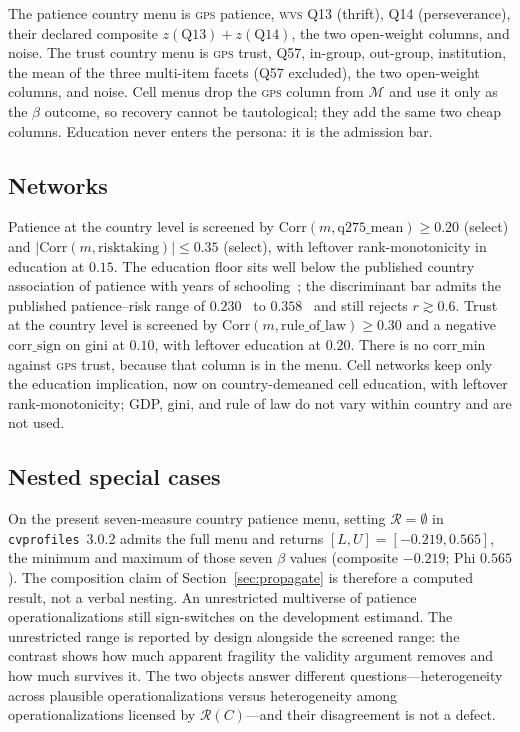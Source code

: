 \documentclass[10pt,letterpaper]{article}
\newcommand{\GPS}{\textsc{gps}}
\newcommand{\WVS}{\textsc{wvs}}
\newcommand{\cvp}{\texttt{cvprofiles}}
\newcommand{\M}{\ensuremath{\mathcal{M}}}
\newcommand{\Rset}{\mathcal{R}}
\begin{document}
The patience country menu is \GPS{} patience, \WVS{} Q13 (thrift), Q14 (perseverance), their declared composite $z(\mathrm{Q13})+z(\mathrm{Q14})$, the two open-weight columns, and noise.
The trust country menu is \GPS{} trust, Q57, in-group, out-group, institution, the mean of the three multi-item facets (Q57 excluded), the two open-weight columns, and noise.
Cell menus drop the \GPS{} column from $\M$ and use it only as the $\beta$ outcome, so recovery cannot be tautological; they add the same two cheap columns.
Education never enters the persona: it is the admission bar.

\subsection{Networks}
\label{sec:app-network}

Patience at the country level is screened by $\mathrm{Corr}(m,\mathrm{q275\_mean})\ge 0.20$ (select) and $|\mathrm{Corr}(m,\mathrm{risktaking})|\le 0.35$ (select), with leftover rank-monotonicity in education at $0.15$.
The education floor sits well below the published country association of patience with years of schooling~\cite{falk2018}; the discriminant bar admits the published patience--risk range of $0.230$~\cite{falk2018} to $0.358$~\cite{hanushek2022} and still rejects $r\gtrsim 0.6$.
Trust at the country level is screened by $\mathrm{Corr}(m,\mathrm{rule\_of\_law})\ge 0.30$ and a negative $\mathrm{corr\_sign}$ on gini at $0.10$, with leftover education at $0.20$.
There is no $\mathrm{corr\_min}$ against \GPS{} trust, because that column is in the menu.
Cell networks keep only the education implication, now on country-demeaned cell education, with leftover rank-monotonicity; GDP, gini, and rule of law do not vary within country and are not used.

\subsection{Nested special cases}
\label{sec:app-special}

On the present seven-measure country patience menu, setting $\Rset=\emptyset$ in \cvp{}~3.0.2 admits the full menu and returns $[L,U]=[-0.219,0.565]$, the minimum and maximum of those seven $\beta$ values (composite $-0.219$; Phi $0.565$).
The composition claim of Section~\ref{sec:propagate} is therefore a computed result, not a verbal nesting.
An unrestricted multiverse of patience operationalizations still sign-switches on the development estimand.
The unrestricted range is reported by design alongside the screened range: the contrast shows how much apparent fragility the validity argument removes and how much survives it.
The two objects answer different questions---heterogeneity across plausible operationalizations versus heterogeneity among operationalizations licensed by $\Rset(C)$---and their disagreement is not a defect.
\end{document}
